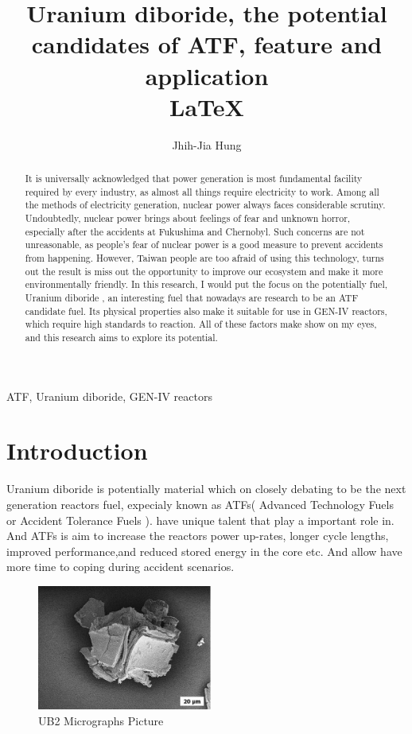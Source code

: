 \documentclass[final,10pt,times,twocolumn]{elsarticle}
\author{Jhih-Jia Hung}
\begin{document}
\begin{frontmatter}
\title{Uranium diboride, the potential candidates of ATF, feature and application \\ \LaTeX}
\begin{abstract}
It is universally acknowledged that power generation is most fundamental facility required by every industry, as almost all things require electricity to work. Among all the methods of electricity generation, nuclear power always faces considerable scrutiny. Undoubtedly, nuclear power brings about feelings of fear and unknown horror, especially after the accidents at Fukushima and Chernobyl. Such concerns are not unreasonable, as people's fear of nuclear power is a good measure to prevent accidents from happening. However, Taiwan people are too afraid of using this technology, turns out the result is miss out the opportunity to improve our ecosystem and make it more environmentally friendly. In this research, I would put the focus on the potentially fuel, Uranium diboride , an interesting fuel that nowadays are research to be an ATF candidate fuel. Its physical properties also make it suitable for use in GEN-IV reactors, which require high standards to reaction. All of these factors make  show on my eyes, and this research aims to explore its potential.
\end{abstract}

\begin{keyword}
ATF, Uranium diboride, GEN-IV reactors
\end{keyword}

\end{frontmatter}

\section{Introduction}
Uranium diboride is potentially material which on closely debating to be the next generation reactors fuel, expecialy known as ATFs( Advanced Technology Fuels or Accident Tolerance Fuels ).  have unique talent that play a important role in. And ATFs is aim to increase the reactors power up-rates, longer cycle lengths, improved performance,and reduced stored energy in the core etc. And allow have more time to coping during accident scenarios.\cite{watkins2022challenges}

\begin{figure}[ht]
    \centering
    \includegraphics[width = 5.75cm]{UB2 Micrographs.png}
    \caption{UB2 Micrographs Picture\cite{watkins2022challenges} }
\end{figure}
\end{document}
